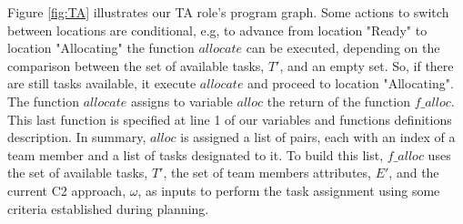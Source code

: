 Figure \ref{fig:TA} illustrates our TA role's program graph. Some actions to switch between locations are conditional, e.g, to advance from location "Ready" to location "Allocating" the function $allocate$ can be executed, depending on the comparison between the set of available tasks, $T'$, and an empty set. So, if there are still tasks available, it execute $allocate$ and proceed to location "Allocating". The function $allocate$ assigns to variable $alloc$ the return of the function $f\_alloc$. This last function is specified at line 1 of our variables and functions definitions description. In summary, $alloc$ is assigned a list of pairs, each with an index of a team member and a list of tasks designated to it. To build this list, $f\_alloc$ uses the set of available tasks, $T'$, the set of team members attributes, $E'$, and the current C2 approach, $\omega$, as inputs to perform the task assignment using some criteria established during planning.

